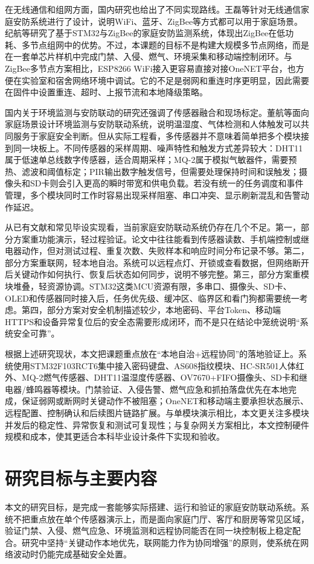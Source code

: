 \documentclass[UTF8,12pt,a4paper,oneside]{ctexbook}
\numberwithin{equation}{chapter}
\let\cite\supercite
\begin{document}
在无线通信和组网方面，国内研究也给出了不同实现路线。王磊等针对无线通信家庭安防系统进行了设计，说明WiFi、蓝牙、ZigBee等方式都可以用于家庭场景\cite{wang2024_home_security_wireless}。纪航等研究了基于STM32与ZigBee的家庭安防监测系统，体现出ZigBee在低功耗、多节点组网中的优势\cite{ji2024_stm32_zigbee}。不过，本课题的目标不是构建大规模多节点网络，而是在一套单芯片样机中完成门禁、入侵、燃气、环境采集和移动端控制闭环。与ZigBee多节点方案相比，ESP8266 WiFi接入更容易直接对接OneNET平台，也方便在实验室和宿舍网络环境中调试。它的不足是弱网和重连时序更明显，因此需要在固件中设置重连、超时、上报节流和本地降级策略。

国内关于环境监测与安防联动的研究还强调了传感器融合和现场标定。董航等面向家庭场景设计环境监测与安防联动系统，说明温湿度、气体检测和人体触发可以共同服务于家庭安全判断\cite{dong2024_env_monitor}。但从实际工程看，多传感器并不意味着简单把多个模块接到同一块板上。不同传感器的采样周期、噪声特性和触发方式差异较大：DHT11属于低速单总线数字传感器，适合周期采样；MQ-2属于模拟气敏器件，需要预热、滤波和阈值标定；PIR输出数字触发信号，但需要处理保持时间和误触发；摄像头和SD卡则会引入更高的瞬时带宽和供电负载。若没有统一的任务调度和事件管理，多个模块同时工作时容易出现采样阻塞、串口冲突、显示刷新混乱和告警动作延迟。

从已有文献和常见毕设实现看，当前家庭安防联动系统仍存在几个不足。第一，部分方案重功能演示，轻过程验证。论文中往往能看到传感器读数、手机端控制或继电器动作，但对测试过程、重复次数、失败样本和响应时间分布记录不够。第二，部分方案重联网，轻本地自治。系统可以远程点灯、开锁或查看数据，但网络断开后关键动作如何执行、恢复后状态如何同步，说明不够完整。第三，部分方案重模块堆叠，轻资源协调。STM32这类MCU资源有限，多串口、摄像头、SD卡、OLED和传感器同时接入后，任务优先级、缓冲区、临界区和看门狗都需要统一考虑。第四，部分方案对安全机制描述较少，本地密码、平台Token、移动端HTTPS和设备异常复位后的安全态需要形成闭环，而不是只在结论中笼统说明“系统安全可靠”。

根据上述研究现状，本文把课题重点放在“本地自治+远程协同”的落地验证上。系统使用STM32F103RCT6集中接入密码键盘、AS608指纹模块、HC-SR501人体红外、MQ-2燃气传感器、DHT11温湿度传感器、OV7670+FIFO摄像头、SD卡和继电器/蜂鸣器等模块。门禁验证、入侵告警、燃气应急和抓拍落盘优先在本地完成，保证弱网或断网时关键动作不被阻塞；OneNET和移动端主要承担状态展示、远程配置、控制确认和后续图片链路扩展。与单模块演示相比，本文更关注多模块并发后的稳定性、异常恢复和测试可复现性；与复杂网关方案相比，本文控制硬件规模和成本，使其更适合本科毕业设计条件下实现和验收。
\section{研究目标与主要内容}
本文的研究目标，是完成一套能够实际搭建、运行和验证的家庭安防联动系统。系统不把重点放在单个传感器演示上，而是面向家庭门厅、客厅和厨房等常见区域，验证门禁、入侵、燃气应急、环境监测和远程协同能否在同一块控制板上稳定配合。研究中坚持“关键动作本地优先，联网能力作为协同增强”的原则，使系统在网络波动时仍能完成基础安全处置。
\end{document}
